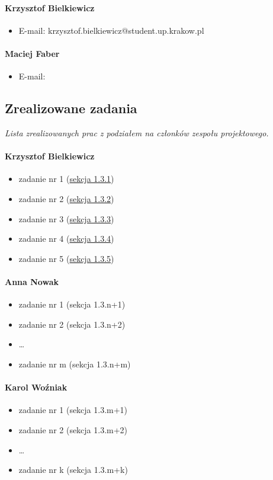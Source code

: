 \documentclass[12pt,a4paper,oneside]{article}
\theoremstyle{definition}
\numberwithin{equation}{section}
\begin{document}
    \paragraph{Krzysztof Bielkiewicz}
    \begin{itemize}
        \item E-mail:  krzysztof.bielkiewicz@student.up.krakow.pl
    \end{itemize}
    \paragraph{Maciej Faber}
    \begin{itemize}
        \item E-mail:
    \end{itemize}

\subsection{Zrealizowane zadania}
\textit{Lista zrealizowanych prac z podziałem na członków zespołu projektowego.}
\paragraph{Krzysztof Bielkiewicz}
\begin{itemize}
\item zadanie nr 1 (\hyperref[1.3.1]{sekcja 1.3.1})
\item zadanie nr 2 (\hyperref[1.3.2]{sekcja 1.3.2})
\item zadanie nr 3 (\hyperref[1.3.3]{sekcja 1.3.3})
\item zadanie nr 4 (\hyperref[1.3.4]{sekcja 1.3.4})
\item zadanie nr 5 (\hyperref[1.3.5]{sekcja 1.3.5})
\end{itemize}
\paragraph{Anna Nowak}
\begin{itemize}
\item zadanie nr 1 (sekcja 1.3.n+1)
\item zadanie nr 2 (sekcja 1.3.n+2)
\item \dots
\item zadanie nr m (sekcja 1.3.n+m)
\end{itemize}
\paragraph{Karol Woźniak}
\begin{itemize}
\item zadanie nr 1 (sekcja 1.3.m+1)
\item zadanie nr 2 (sekcja 1.3.m+2)
\item \dots
\item zadanie nr k (sekcja 1.3.m+k)

\end{itemize}
\end{document}

